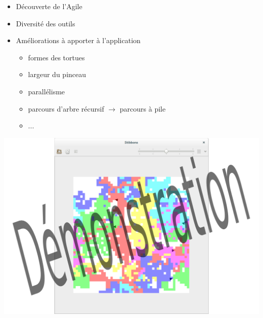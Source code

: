 \begin{frame}
\begin{itemize}
\item Découverte de l'Agile
\item Diversité des outils
\item Améliorations à apporter à l'application
	\begin{itemize}
	\item formes des tortues
	\item largeur du pinceau
	\item parallélisme
	\item parcours d'arbre récursif $\rightarrow$ parcours à pile
	\item ...
	\end{itemize}
\end{itemize}
\end{frame}

\begin{frame}
\includegraphics[scale=0.3]{doc/Presentation/image/demo.pdf}
\end{frame}
